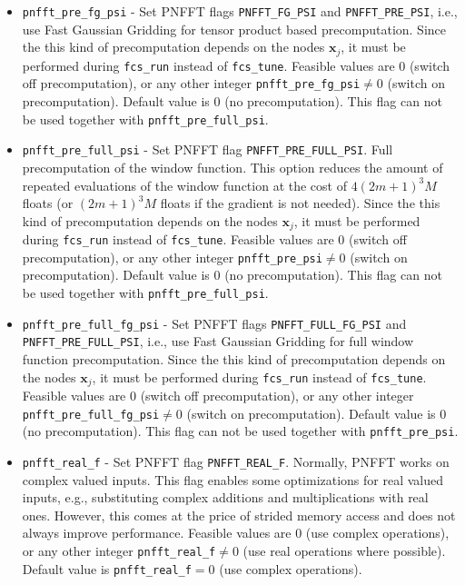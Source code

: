 \begin{itemize}
  \item \verb!pnfft_pre_fg_psi! -
    Set PNFFT flags \verb!PNFFT_FG_PSI! and \verb!PNFFT_PRE_PSI!, i.e., use Fast Gaussian Gridding for tensor product based precomputation.
    Since the this kind of precomputation depends on the nodes $\mathbf x_j$, it must be performed during \verb!fcs_run! instead of \verb!fcs_tune!.
    Feasible values are $0$ (switch off precomputation), or any other integer \verb!pnfft_pre_fg_psi!$\ne0$ (switch on precomputation).
    Default value is $0$ (no precomputation). This flag can not be used together with \verb!pnfft_pre_full_psi!.
  \item \verb!pnfft_pre_full_psi! -
    Set PNFFT flag \verb!PNFFT_PRE_FULL_PSI!. Full precomputation of the window function. This option reduces the amount of repeated evaluations of the window function at the cost of
    $4(2m+1)^3M$ floats (or $(2m+1)^3M$ floats if the gradient is not needed).
    Since the this kind of precomputation depends on the nodes $\mathbf x_j$, it must be performed during \verb!fcs_run! instead of \verb!fcs_tune!.
    Feasible values are $0$ (switch off precomputation), or any other integer \verb!pnfft_pre_psi!$\ne0$ (switch on precomputation).
    Default value is $0$ (no precomputation). This flag can not be used together with \verb!pnfft_pre_full_psi!.
  \item \verb!pnfft_pre_full_fg_psi! -
    Set PNFFT flags \verb!PNFFT_FULL_FG_PSI! and \verb!PNFFT_PRE_FULL_PSI!, i.e., use Fast Gaussian Gridding for full window function precomputation.
    Since the this kind of precomputation depends on the nodes $\mathbf x_j$, it must be performed during \verb!fcs_run! instead of \verb!fcs_tune!.
    Feasible values are $0$ (switch off precomputation), or any other integer \verb!pnfft_pre_full_fg_psi!$\ne0$ (switch on precomputation).
    Default value is $0$ (no precomputation). This flag can not be used together with \verb!pnfft_pre_psi!.
  \item \verb!pnfft_real_f! -
    Set PNFFT flag \verb!PNFFT_REAL_F!. Normally, PNFFT works on complex valued inputs. This flag enables some optimizations for real valued inputs, e.g., substituting complex additions and multiplications with real ones.
    However, this comes at the price of strided memory access and does not always improve performance.
    Feasible values are $0$ (use complex operations), or any other integer \verb!pnfft_real_f!$\ne0$ (use real operations where possible).
    Default value is \verb!pnfft_real_f!$=0$ (use complex operations).
\end{itemize}

